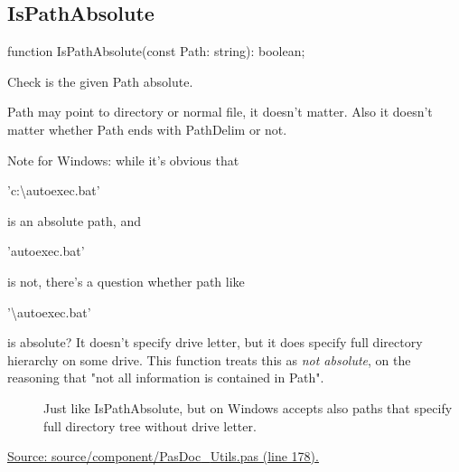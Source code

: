 \documentclass{report}
\newif\ifpdf
\begin{document}
\subsection*{IsPathAbsolute}
\fi
\label{PasDoc_Utils-IsPathAbsolute}
\begin{list}{}{
\setlength{\itemindent}{0cm}
\setlength{\listparindent}{0cm}
\setlength{\leftmargin}{\evensidemargin}
\addtolength{\leftmargin}{\tmplength}
\settowidth{\labelsep}{X}
\addtolength{\leftmargin}{\labelsep}
\setlength{\labelwidth}{\tmplength}
}
\item[\textbf{Declaration}\hfill]
\ifpdf
\begin{flushleft}
\fi
\begin{ttfamily}
function IsPathAbsolute(const Path: string): boolean;\end{ttfamily}

\ifpdf
\end{flushleft}
\fi

\par
\item[\textbf{Description}]
Check is the given Path absolute.

Path may point to directory or normal file, it doesn't matter. Also it doesn't matter whether Path ends with PathDelim or not.

Note for Windows: while it's obvious that \begin{ttfamily}'c:{\textbackslash}autoexec.bat'\end{ttfamily} is an absolute path, and \begin{ttfamily}'autoexec.bat'\end{ttfamily} is not, there's a question whether path like \begin{ttfamily}'{\textbackslash}autoexec.bat'\end{ttfamily} is absolute? It doesn't specify drive letter, but it does specify full directory hierarchy on some drive. This function treats this as \textit{not absolute}, on the reasoning that "not all information is contained in Path".

\item[\textbf{See also}]
\begin{description}
\item[\begin{ttfamily}IsPathAbsoluteOnDrive\end{ttfamily}(\ref{PasDoc_Utils-IsPathAbsoluteOnDrive})] 
Just like IsPathAbsolute, but on Windows accepts also paths that specify full directory tree without drive letter.
\end{description}
\par
\href{https://github.com/pasdoc/pasdoc/blob/master/source/component/PasDoc_Utils.pas#L178}{Source: source/component/PasDoc{\_}Utils.pas (line 178).}

\end{list}
\ifpdf
\end{document}

